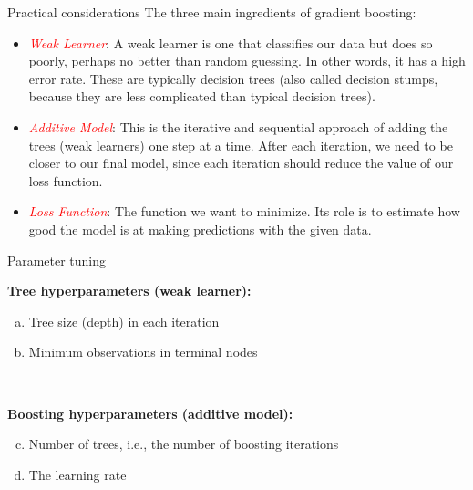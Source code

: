 \documentclass[
  10pt,
  ignorenonframetext,
]{beamer}
\begin{document}
\begin{frame}{Practical considerations}
\protect\hypertarget{practical-considerations}{}
The three main ingredients of gradient boosting:

\vspace{2mm}

\begin{itemize}
\item
  \emph{\textcolor{red}{Weak Learner}}: A weak learner is one that
  classifies our data but does so poorly, perhaps no better than random
  guessing. In other words, it has a high error rate. These are
  typically decision trees (also called decision stumps, because they
  are less complicated than typical decision trees).
\item
  \emph{\textcolor{red}{Additive Model}}: This is the iterative and
  sequential approach of adding the trees (weak learners) one step at a
  time. After each iteration, we need to be closer to our final model,
  since each iteration should reduce the value of our loss function.
\item
  \emph{\textcolor{red}{Loss Function}}: The function we want to
  minimize. Its role is to estimate how good the model is at making
  predictions with the given data.
\end{itemize}
\end{frame}

\begin{frame}{Parameter tuning}
\protect\hypertarget{parameter-tuning}{}
\(~\)

\textbf{Tree hyperparameters (weak learner):}

\begin{enumerate}
[a)]
\item
  Tree size (depth) in each iteration
\item
  Minimum observations in terminal nodes
\end{enumerate}

\(~\)

\textbf{Boosting hyperparameters (additive model):}

\begin{enumerate}
[a)]
\setcounter{enumi}{2}
\item
  Number of trees, i.e., the number of boosting iterations
\item
  The learning rate
\end{enumerate}
\end{frame}
\end{document}
